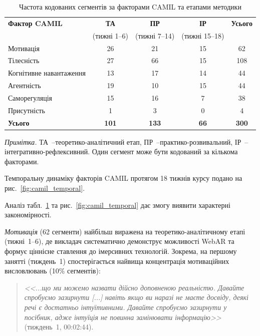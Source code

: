\begin{table}[!h]
\centering
\caption{Частота кодованих сегментів за факторами CAMIL та етапами методики}
\label{tab:camil_stages}
\small
\begin{tabular}{|p{3.5cm}|c|c|c|c|}
\hline
\textbf{Фактор CAMIL} & \textbf{ТА} & \textbf{ПР} & \textbf{ІР} & \textbf{Усього} \\
 & (тижні 1--6) & (тижні 7--14) & (тижні 15--18) & \\
\hline
Мотивація & 26 & 21 & 15 & 62 \\
\hline
Тілесність & 27 & 66 & 15 & 108 \\
\hline
Когнітивне навантаження & 13 & 17 & 14 & 44 \\
\hline
Агентність & 19 & 10 & 15 & 44 \\
\hline
Саморегуляція & 15 & 16 & 7 & 38 \\
\hline
Присутність & 1 & 3 & 0 & 4 \\
\hline
\textbf{Усього} & \textbf{101} & \textbf{133} & \textbf{66} & \textbf{300} \\
\hline
\end{tabular}

\medskip
\footnotesize
\textit{Примітка.} ТА~--теоретико-аналітичний етап, ПР~--практико-розвивальний, ІР~--інтегративно-рефлексивний. Один сегмент може бути кодований за кількома факторами.
\end{table}

Темпоральну динаміку факторів CAMIL протягом 18 тижнів курсу подано на рис.~\ref{fig:camil_temporal}.



Аналіз табл.~\ref{tab:camil_stages} та рис.~\ref{fig:camil_temporal} дає змогу виявити характерні закономірності.

\textit{Мотивація} (62 сегменти) найбільш виражена на теоретико-аналітичному етапі (тижні~1--6), де викладач систематично демонструє можливості WebAR та формує ціннісне ставлення до імерсивних технологій. Зокрема, на першому занятті (тиждень~1) спостерігається найвища концентрація мотиваційних висловлювань (10\% сегментів):

\begin{quote}
\textit{<<...що ми можемо назвати дійсно доповненою реальністю. Давайте спробуємо зазирнути \textnormal{[...]} навіть якщо ви наразі не маєте досвіду, деякі речі є достатньо інтуїтивними. Давайте спробуємо зазирнути у посібник, адже інтуїція не повинна замінювати інформацію>>} (тиждень~1, 00:02:44).
\end{quote}

